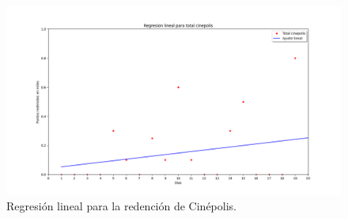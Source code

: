 \documentclass[a4,notitlepage,12pt,spanish]{jedm}
\begin{document}
\begin{figure}[!htb]
\centering
\includegraphics[scale=0.4]{regresion_cine}
\caption{Regresi\'on lineal para la redenci\'on de Cin\'epolis.}
\label{fig:regresion_cine}
\end{figure} 
\end{document}
